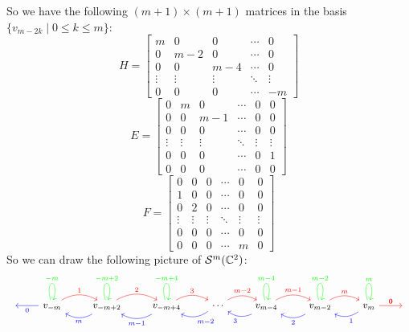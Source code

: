 So we have the following $(m+1)\times(m+1)$ matrices in the basis $\{v_{m-2k} \mid 0 \leq k \leq m\}$:
\begin{equation*}
  H=
  \begin{bmatrix}
    m & 0 & 0 & \cdots & 0 \\
    0 & m-2 & 0 & \cdots & 0 \\
    0 & 0 & m-4 & \cdots & 0 \\
    \vdots & \vdots & \vdots & \ddots & \vdots \\
    0 & 0 & 0 & \cdots & -m
  \end{bmatrix}
\end{equation*}
\begin{equation*}
  E=
  \begin{bmatrix}
    0 & m & 0 & \cdots & 0 & 0 \\
    0 & 0 & m-1 & \cdots & 0 & 0 \\
    0 & 0 & 0 & \cdots & 0 & 0 \\
    \vdots & \vdots & \vdots & \ddots & \vdots & \vdots \\
    0 & 0 & 0 & \cdots & 0 & 1 \\
    0 & 0 & 0 & \cdots & 0 & 0
  \end{bmatrix}
\end{equation*}
\begin{equation*}
  F=
  \begin{bmatrix}
    0 & 0 & 0 & \cdots & 0 & 0 \\
    1 & 0 & 0 & \cdots & 0 & 0 \\
    0 & 2 & 0 & \cdots & 0 & 0 \\
    \vdots & \vdots & \vdots & \ddots & \vdots & \vdots \\
    0 & 0 & 0 & \cdots & 0 & 0 \\
    0 & 0 & 0 & \cdots & m & 0
  \end{bmatrix}
\end{equation*}
So we can draw the following picture of $\mathcal{S}^m(\mathbb{C}^2)$:
\begin{equation*}
  \begin{tikzcd}
    {} & v_{-m} \ar[l, color=blue, "0"] \ar[loop above, color=green, "-m", looseness=20] \arrow[r, bend left, color=red, "1"] & v_{-m+2} \ar[loop above, color=green, "-m+2", looseness=20] \arrow[l, bend left, color=blue, "m"] \arrow[r, bend left, color=red, "2"] & v_{-m+4} \ar[loop above, color=green, "-m+4", looseness=20] \arrow[l, bend left, color=blue, "m-1"] \arrow[r, bend left, color=red, "3"] & \cdots \arrow[l, bend left, color=blue, "m-2"] \arrow[r, bend left, color=red, "m-2"] & v_{m-4} \ar[loop above, color=green, "m-4", looseness=20] \arrow[l, bend left, color=blue, "3"] \arrow[r, bend left, color=red, "m-1"] & v_{m-2} \ar[loop above, color=green, "m-2", looseness=20] \arrow[l, bend left, color=blue, "2"] \arrow[r, bend left, color=red, "m"] & v_m \ar[loop above, color=green, "m", looseness=20] \arrow[l, bend left, color=blue, "1"] \ar[r, "0", color=red, "0"] & {}
  \end{tikzcd}
\end{equation*}
